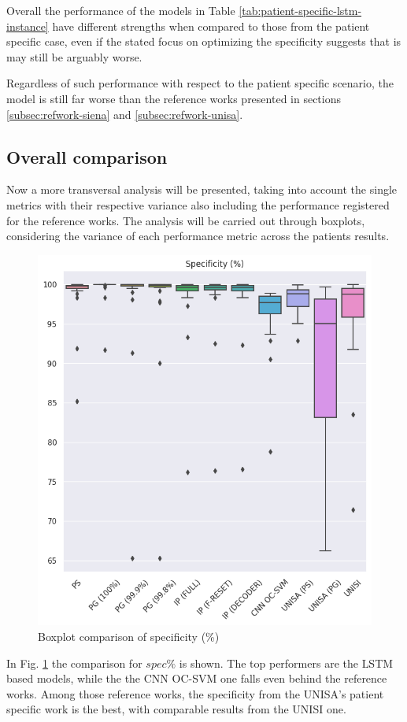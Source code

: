 Overall the performance of the models in Table \ref{tab:patient-specific-lstm-instance} have different strengths when compared to those from the patient specific case, even if the stated focus on optimizing the specificity suggests that is may still be arguably worse.

Regardless of such performance with respect to the patient specific scenario, the model is still far worse than the reference works presented in sections \ref{subsec:refwork-siena} and \ref{subsec:refwork-unisa}.

\clearpage
\subsection{Overall comparison}
Now a more transversal analysis will be presented, taking into account the single metrics with their respective variance also including the performance registered for the reference works. The analysis will be carried out through boxplots, considering the variance of each performance metric across the patients results.

\begin{figure}[ht]
    \centering
    \includegraphics[width=1.0\textwidth]{images/Experimental-validation/boxplot_spec.png}
    \caption{Boxplot comparison of specificity (\%)}
    \label{fig:boxplot_spec}
\end{figure}
In Fig. \ref{fig:boxplot_spec} the comparison for $spec\%$ is shown. The top performers are the \gls{LSTM} based models, while the the \gls{CNN} \gls{OC-SVM} one falls even behind the reference works. Among those reference works, the specificity from the UNISA's patient specific work is the best, with comparable results from the \gls{UNISI} one.

